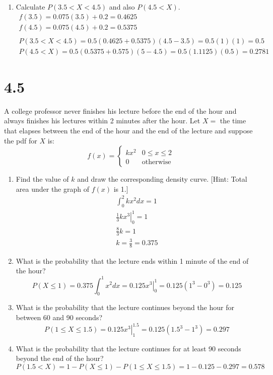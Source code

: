 \documentclass[letterpaper,12pt,fleqn]{article}
\begin{document}
\begin{enumerate}[label={\alph*)}]
\item Calculate \(P(3.5<X<4.5)\) and also \(P(4.5<X)\).
  \begin{gather*}
    f(3.5)=0.075(3.5)+0.2=0.4625 \\
    f(4.5)=0.075(4.5)+0.2=0.5375 \\
    \\
    P(3.5<X<4.5)=0.5(0.4625+0.5375)(4.5-3.5)=0.5(1)(1)=0.5 \\
    P(4.5<X)=0.5(0.5375+0.575)(5-4.5)=0.5(1.1125)(0.5)=0.2781
  \end{gather*}
\end{enumerate}

\section*{4.5}

A college professor never finishes his lecture before the end of the hour and always finishes his lectures within 2 minutes
after the hour.  Let \(X=\) the time that elapses between the end of the hour and the end of the lecture and suppose the
pdf for \(X\) is:
\[f(x)=\begin{cases}
kx^2 & 0\le x\le 2 \\
0 & \text{otherwise}
\end{cases}\]
\begin{enumerate}[label={\alph*)}]
\item Find the value of \(k\) and draw the corresponding density curve. [Hint: Total area under the graph of \(f(x)\) is 1.]
  \begin{gather*}
    \int_0^2kx^2dx=1 \\
    \left.\frac{1}{3}kx^3\right|_0^1=1 \\
    \frac{8}{3}k=1 \\
    k=\frac{3}{8}=0.375
  \end{gather*}
\item What is the probability that the lecture ends within 1 minute of the end of the hour?
  \[P(X\le1)=0.375\int_0^1x^2dx=\left.0.125x^3\right|_0^1=0.125(1^3-0^3)=0.125\]
\item What is the probability that the lecture continues beyond the hour for between 60 and 90 seconds?
  \[P(1\le X\le1.5)=\left.0.125x^3\right|_1^{1.5}=0.125(1.5^3-1^3)=0.297\]
\item What is the probability that the lecture continues for at least 90 seconds beyond the end of the hour?
  \[P(1.5<X)=1-P(X\le1)-P(1\le X\le1.5)=1-0.125-0.297=0.578\]
\end{enumerate}
\end{document}
